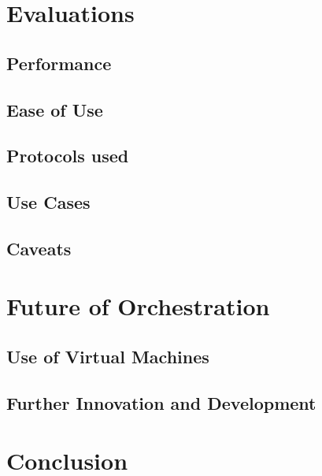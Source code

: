 \documentclass[10pt,twocolumn]{article}
\begin{document}
\section{Evaluations}



\subsection{Performance}



\subsection{Ease of Use}



\subsection{Protocols used}



\subsection{Use Cases}



\subsection{Caveats}




\section{Future of Orchestration}



\subsection{Use of Virtual Machines}



\subsection{Further Innovation and Development}



\section{Conclusion}





\end{document}
